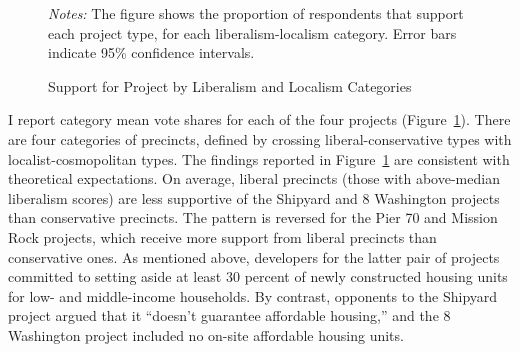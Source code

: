 \documentclass[article,12pt]{memoir}
\begin{document}
\begin{figure}\centering
  \caption{Support for Project by Liberalism and Localism Categories}
  \label{fig:hg_g_lib_loc}
  \begin{measuredfigure}
  \end{measuredfigure}
  \begin{tablenotes}[flushleft]
    \item \hspace{-.2em}\emph{Notes:} The figure shows the proportion of respondents that support each project type, for each liberalism-localism category. Error bars indicate 95\% confidence intervals.
  \end{tablenotes}
\end{figure}

I report category mean vote shares for each of the four projects (Figure~\ref{fig:hg_g_lib_loc}). There are four categories of precincts, defined by crossing liberal-conservative types with  localist-cosmopolitan types.  The findings reported in Figure~\ref{fig:hg_g_lib_loc} are consistent with theoretical expectations.  On average, liberal precincts (those with above-median liberalism scores) are less supportive of the Shipyard and 8 Washington projects than conservative precincts.  The pattern is reversed for the Pier 70 and Mission Rock projects, which receive more support from liberal precincts than conservative ones.  As mentioned above, developers for the latter pair of projects committed to setting aside at least 30 percent of newly constructed housing units for low- and middle-income households.  By contrast, opponents to the Shipyard project argued that it ``doesn't guarantee affordable housing,'' and the 8 Washington project included no on-site affordable housing units.  
\end{document}
